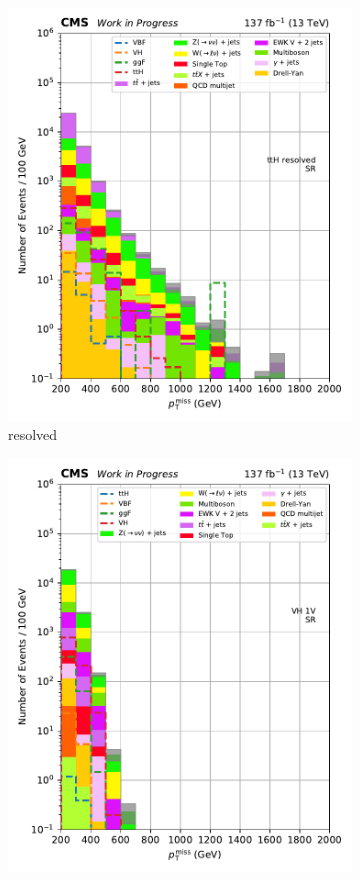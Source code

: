 \begin{figure}[htbp]
\begin{subfigure}[b]{0.24\textwidth}
        \includegraphics[width=\textwidth]{figures/region_plots/full_Run2/region_0/ttH_resolved.pdf}
        \caption{\ttH resolved}
    \end{subfigure}
    \begin{subfigure}[b]{0.24\textwidth}
        \includegraphics[width=\textwidth]{figures/region_plots/full_Run2/region_0/VH_1V.pdf}

\end{subfigure}
\end{figure}

